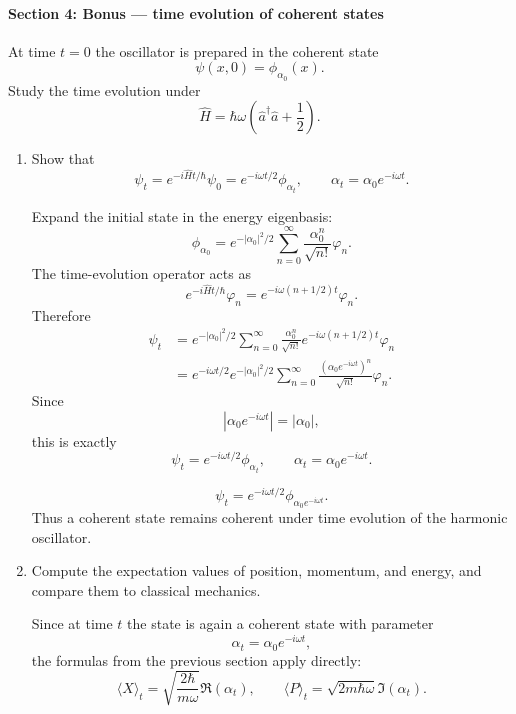 \documentclass[11pt,a4paper]{scrartcl}
\begin{document}
\paragraph{Section 4: Bonus --- time evolution of coherent states}

At time $t=0$ the oscillator is prepared in the coherent state
\[
\psi(x,0)=\phi_{\alpha_0}(x).
\]
Study the time evolution under
\[
\hat H=\hbar\omega\left(\hat a^\dagger\hat a+\frac12\right).
\]

\begin{enumerate}[label=(\alph*)]
    \item Show that
    \[
    \psi_t = e^{-i\hat H t/\hbar}\psi_0
    = e^{-i\omega t/2}\phi_{\alpha_t},
    \qquad
    \alpha_t=\alpha_0 e^{-i\omega t}.
    \]

    \begin{calculationbox}
    Expand the initial state in the energy eigenbasis:
    \[
    \phi_{\alpha_0}
    =
    e^{-|\alpha_0|^2/2}\sum_{n=0}^\infty
    \frac{\alpha_0^n}{\sqrt{n!}}\varphi_n.
    \]
    The time-evolution operator acts as
    \[
    e^{-i\hat H t/\hbar}\varphi_n
    = e^{-i\omega(n+1/2)t}\varphi_n.
    \]
    Therefore
    \begin{align*}
        \psi_t
        &= e^{-|\alpha_0|^2/2}\sum_{n=0}^\infty
        \frac{\alpha_0^n}{\sqrt{n!}}
        e^{-i\omega(n+1/2)t}\varphi_n \\
        &= e^{-i\omega t/2}
        e^{-|\alpha_0|^2/2}
        \sum_{n=0}^\infty
        \frac{(\alpha_0 e^{-i\omega t})^n}{\sqrt{n!}}\varphi_n.
    \end{align*}
    Since
    \[
    |\alpha_0 e^{-i\omega t}|=|\alpha_0|,
    \]
    this is exactly
    \[
    \psi_t = e^{-i\omega t/2}\phi_{\alpha_t},
    \qquad
    \alpha_t=\alpha_0 e^{-i\omega t}.
    \]
    \end{calculationbox}

    \begin{answerbox}
    \[
    \boxed{
    \psi_t=e^{-i\omega t/2}\phi_{\alpha_0 e^{-i\omega t}}.
    }
    \]
    Thus a coherent state remains coherent under time evolution of the harmonic oscillator.
    \end{answerbox}

    \item Compute the expectation values of position, momentum, and energy, and compare them to classical mechanics.

    \begin{calculationbox}
    Since at time $t$ the state is again a coherent state with parameter
    \[
    \alpha_t=\alpha_0 e^{-i\omega t},
    \]
    the formulas from the previous section apply directly:
    \[
    \langle X\rangle_t=\sqrt{\frac{2\hbar}{m\omega}}\Re(\alpha_t),
    \qquad
    \langle P\rangle_t=\sqrt{2m\hbar\omega}\Im(\alpha_t).
    \]


\end{calculationbox}
\end{enumerate}
\end{document}
